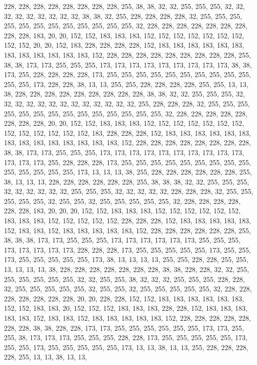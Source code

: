 {	228, 228, 228, 228, 228, 228, 228, 228, 255, 38,  38,  32,  32,  255, 255, 255, 32,  32,  32,  32,  32,  32,  32,  32,  32,  38,  38,  32,  255, 228, 228, 228, 228, 32,  255, 255, 255, 255, 255, 255, 255, 255, 255, 255, 255, 255, 32,  228, 228, 228, 228, 228, 228, 228, 228, 228, 183, 20,  20,  152, 152, 183, 183, 183, 152, 152, 152, 152, 152, 152, 152, 152, 152, 20,  20,  152, 183, 228, 228, 228, 228, 152, 183, 183, 183, 183, 183, 183, 183, 183, 183, 183, 183, 183, 152, 228, 228, 228, 228, 228, 228, 228, 228, 228, 255, 38,  38,  173, 173, 255, 255, 255, 173, 173, 173, 173, 173, 173, 173, 173, 173, 38,  38,  173, 255, 228, 228, 228, 228, 173, 255, 255, 255, 255, 255, 255, 255, 255, 255, 255, 255, 255, 173, 228, 228, 38,  13,  13,  255, 255, 228, 228, 228, 228, 255, 255, 13,  13,  38,  228, 
	228, 228, 228, 228, 228, 228, 228, 228, 38,  38,  32,  32,  255, 255, 255, 32,  32,  32,  32,  32,  32,  32,  32,  32,  32,  32,  32,  32,  255, 228, 228, 228, 32,  255, 255, 255, 255, 255, 255, 255, 255, 255, 255, 255, 255, 255, 255, 32,  228, 228, 228, 228, 228, 228, 228, 228, 20,  20,  152, 152, 183, 183, 183, 152, 152, 152, 152, 152, 152, 152, 152, 152, 152, 152, 152, 152, 183, 228, 228, 228, 152, 183, 183, 183, 183, 183, 183, 183, 183, 183, 183, 183, 183, 183, 183, 152, 228, 228, 228, 228, 228, 228, 228, 228, 38,  38,  173, 173, 255, 255, 255, 173, 173, 173, 173, 173, 173, 173, 173, 173, 173, 173, 173, 173, 255, 228, 228, 228, 173, 255, 255, 255, 255, 255, 255, 255, 255, 255, 255, 255, 255, 255, 255, 173, 13,  13,  13,  38,  255, 228, 228, 228, 228, 228, 228, 255, 38,  13,  13,  13,  
	228, 228, 228, 228, 228, 228, 255, 38,  38,  38,  32,  32,  255, 255, 255, 32,  32,  32,  32,  32,  32,  255, 255, 255, 32,  32,  32,  32,  32,  228, 228, 228, 32,  255, 255, 255, 255, 255, 32,  255, 255, 32,  255, 255, 255, 255, 255, 32,  228, 228, 228, 228, 228, 228, 183, 20,  20,  20,  152, 152, 183, 183, 183, 152, 152, 152, 152, 152, 152, 183, 183, 183, 152, 152, 152, 152, 152, 228, 228, 228, 152, 183, 183, 183, 183, 183, 152, 183, 183, 152, 183, 183, 183, 183, 183, 152, 228, 228, 228, 228, 228, 228, 255, 38,  38,  38,  173, 173, 255, 255, 255, 173, 173, 173, 173, 173, 173, 255, 255, 255, 173, 173, 173, 173, 173, 228, 228, 228, 173, 255, 255, 255, 255, 255, 173, 255, 255, 173, 255, 255, 255, 255, 255, 173, 38,  13,  13,  13,  13,  255, 255, 228, 228, 255, 255, 13,  13,  13,  13,  38,  
	228, 228, 228, 228, 228, 228, 228, 38,  38,  228, 228, 32,  32,  255, 255, 255, 255, 255, 255, 32,  32,  255, 255, 38,  32,  32,  32,  255, 255, 255, 228, 228, 32,  255, 255, 255, 255, 255, 32,  255, 255, 32,  255, 255, 255, 255, 255, 32,  228, 228, 228, 228, 228, 228, 228, 20,  20,  228, 228, 152, 152, 183, 183, 183, 183, 183, 183, 152, 152, 183, 183, 20,  152, 152, 152, 183, 183, 183, 228, 228, 152, 183, 183, 183, 183, 183, 152, 183, 183, 152, 183, 183, 183, 183, 183, 152, 228, 228, 228, 228, 228, 228, 228, 38,  38,  228, 228, 173, 173, 255, 255, 255, 255, 255, 255, 173, 173, 255, 255, 38,  173, 173, 173, 255, 255, 255, 228, 228, 173, 255, 255, 255, 255, 255, 173, 255, 255, 173, 255, 255, 255, 255, 255, 173, 13,  13,  38,  13,  13,  255, 228, 228, 228, 228, 255, 13,  13,  38,  13,  13,  
}
